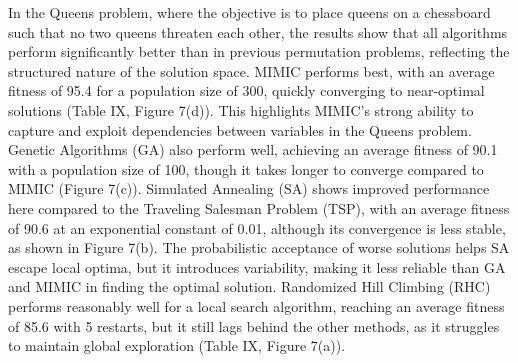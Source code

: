 In the Queens problem, where the objective is to place queens on a chessboard such that no two queens threaten each other, the results show that all algorithms perform significantly better than in previous permutation problems, reflecting the structured nature of the solution space. MIMIC performs best, with an average fitness of 95.4 for a population size of 300, quickly converging to near-optimal solutions (Table IX, Figure 7(d)). This highlights MIMIC’s strong ability to capture and exploit dependencies between variables in the Queens problem. Genetic Algorithms (GA) also perform well, achieving an average fitness of 90.1 with a population size of 100, though it takes longer to converge compared to MIMIC (Figure 7(c)). Simulated Annealing (SA) shows improved performance here compared to the Traveling Salesman Problem (TSP), with an average fitness of 90.6 at an exponential constant of 0.01, although its convergence is less stable, as shown in Figure 7(b). The probabilistic acceptance of worse solutions helps SA escape local optima, but it introduces variability, making it less reliable than GA and MIMIC in finding the optimal solution. Randomized Hill Climbing (RHC) performs reasonably well for a local search algorithm, reaching an average fitness of 85.6 with 5 restarts, but it still lags behind the other methods, as it struggles to maintain global exploration (Table IX, Figure 7(a)). 
